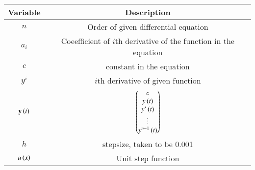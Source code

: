 \begin{tabular}[12pt]{ |c| c|}
    \hline
    \textbf{Variable} & \textbf{Description}\\
    \hline
    $n$ & Order of given differential equation\\
    \hline
    $a_i$ & Coeefficient of $i$th derivative of the function in the equation\\
    \hline
    $c$ & constant in the equation\\
    \hline
    $y^i$ & $i$th derivative of given function\\
    \hline
    $\mathbf{y}\left(t\right)$ & $\begin{pmatrix}c \\ y\left(t\right) \\ y^\prime\left(t\right) \\ \vdots \\ y^{n-1}\left(t\right)\end{pmatrix}$\\
    \hline
    $h$ & stepsize, taken to be 0.001\\
    \hline
    $u\left(x\right)$ & Unit step function\\
    \hline
    \end{tabular}
